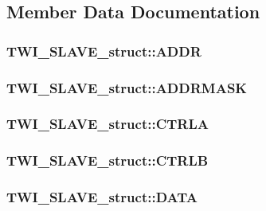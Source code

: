 \subsection{Member Data Documentation}
\hypertarget{struct_t_w_i___s_l_a_v_e__struct_ab9fb9ebe8412ecb0543868c5b91e23e1}{
\subsubsection[{ADDR}]{ {\bf TWI\_\-SLAVE\_\-struct::ADDR}}}
\label{struct_t_w_i___s_l_a_v_e__struct_ab9fb9ebe8412ecb0543868c5b91e23e1}
\hypertarget{struct_t_w_i___s_l_a_v_e__struct_a2bd9702983b73ea43d8477480f23d01e}{
\subsubsection[{ADDRMASK}]{ {\bf TWI\_\-SLAVE\_\-struct::ADDRMASK}}}
\label{struct_t_w_i___s_l_a_v_e__struct_a2bd9702983b73ea43d8477480f23d01e}
\hypertarget{struct_t_w_i___s_l_a_v_e__struct_a368e61b5070765979e1d5d8a00687a92}{
\subsubsection[{CTRLA}]{ {\bf TWI\_\-SLAVE\_\-struct::CTRLA}}}
\label{struct_t_w_i___s_l_a_v_e__struct_a368e61b5070765979e1d5d8a00687a92}
\hypertarget{struct_t_w_i___s_l_a_v_e__struct_a42b52363308067436689b8f9d9de05e3}{
\subsubsection[{CTRLB}]{ {\bf TWI\_\-SLAVE\_\-struct::CTRLB}}}
\label{struct_t_w_i___s_l_a_v_e__struct_a42b52363308067436689b8f9d9de05e3}
\hypertarget{struct_t_w_i___s_l_a_v_e__struct_a7a233a95d65c4d866e893aed944853a9}{
\subsubsection[{DATA}]{ {\bf TWI\_\-SLAVE\_\-struct::DATA}}}
